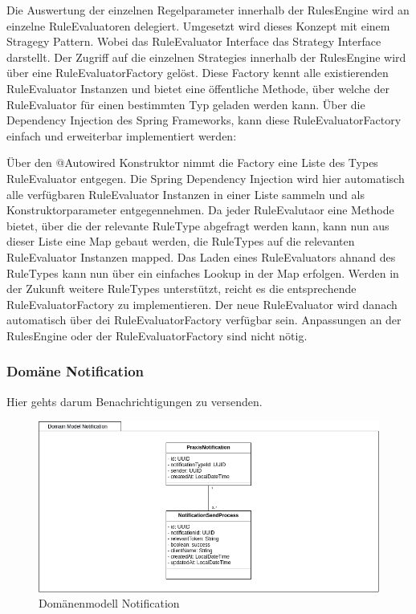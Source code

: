 Die Auswertung der einzelnen Regelparameter innerhalb der RulesEngine wird an einzelne RuleEvaluatoren delegiert.
Umgesetzt wird dieses Konzept mit einem Stragegy Pattern.
Wobei das RuleEvaluator Interface das Strategy Interface darstellt.
Der Zugriff auf die einzelnen Strategies innerhalb der RulesEngine wird über eine RuleEvaluatorFactory gelöst.
Diese Factory kennt alle existierenden RuleEvaluator Instanzen und bietet eine öffentliche Methode, über welche der RuleEvaluator für einen bestimmten Typ geladen werden kann.
Über die Dependency Injection des Spring Frameworks, kann diese RuleEvaluatorFactory einfach und erweiterbar implementiert werden:



\clearpage



Über den @Autowired Konstruktor nimmt die Factory eine Liste des Types RuleEvaluator entgegen.
Die Spring Dependency Injection wird hier automatisch alle verfügbaren RuleEvaluator Instanzen in einer Liste sammeln und als Konstruktorparameter entgegennehmen.
Da jeder RuleEvalutaor eine Methode bietet, über die der relevante RuleType abgefragt werden kann, kann nun aus dieser Liste eine Map gebaut werden, die RuleTypes auf die relevanten RuleEvaluator Instanzen mapped.
Das Laden eines RuleEvaluators ahnand des RuleTypes kann nun über ein einfaches Lookup in der Map erfolgen.
Werden in der Zukunft weitere RuleTypes unterstützt, reicht es die entsprechende RuleEvaluatorFactory zu implementieren.
Der neue RuleEvaluator wird danach automatisch über dei RuleEvaluatorFactory verfügbar sein.
Anpassungen an der RulesEngine oder der RuleEvaluatorFactory sind nicht nötig.


\clearpage
\subsubsection*{Domäne Notification}

Hier gehts darum Benachrichtigungen zu versenden.

\begin{figure}[h]
    \centering
    \begin{minipage}[b]{1.0\textwidth}
        \includegraphics[width=\textwidth]{graphics/Class_Notification_Domain}
        \caption{Domänenmodell Notification}
    \end{minipage}
\end{figure}

